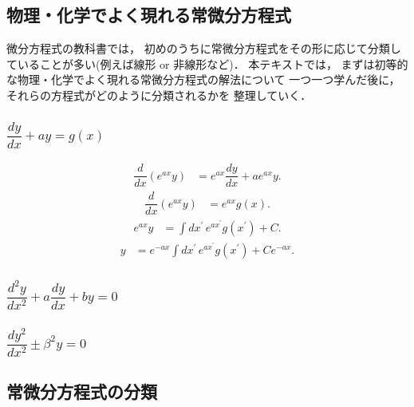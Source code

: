 \subsection{物理・化学でよく現れる常微分方程式}
%
微分方程式の教科書では，
初めのうちに常微分方程式をその形に応じて分類していることが多い(例えば線形 or 非線形など)．
本テキストでは，
まずは初等的な物理・化学でよく現れる常微分方程式の解法について
一つ一つ学んだ後に，それらの方程式がどのように分類されるかを
整理していく．

\subsubsection{$\dfrac{dy}{dx} + a y = g(x)$}
\begin{align}
  \dfrac{d}{dx}\left(e^{ax}y\right) & =e^{ax}\dfrac{dy}{dx}+ae^{ax}y.
\end{align}
\begin{align}
  \dfrac{d}{dx}\left(e^{ax}y\right) & =e^{ax}g\left(x\right).
\end{align}
\begin{align}
  e^{ax}y & =\int dx^{\prime}\,e^{ax^{\prime}}g\left(x^{\prime}\right)+C.
\end{align}
\begin{align}
 y & =e^{-ax}\int dx^{\prime}\,e^{ax^{\prime}}g\left(x^{\prime}\right)+Ce^{-ax}.
\end{align}
%
\subsubsection{$\dfrac{d^2y}{dx^2} + a \dfrac{dy}{dx} + by = 0$}
\subsubsection{$\dfrac{dy^2}{dx^2} \pm \beta^2 y =0$}
\subsection{常微分方程式の分類}
